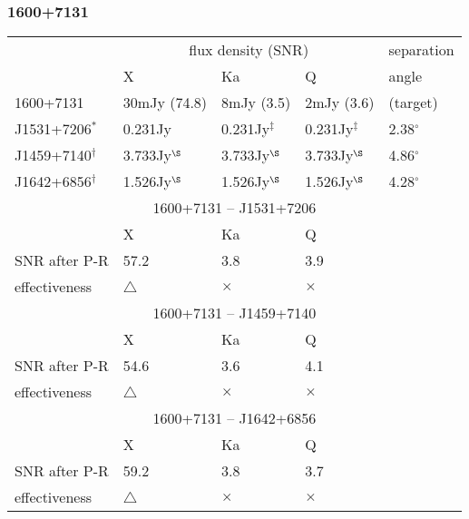 \subsubsection{
  1600+7131
}
\begin{tabular}{p{30mm}|p{30mm}|p{30mm}|p{30mm}|p{20mm}}
\hline
                 & \multicolumn{3}{c|}{flux density (SNR)}
                 & separation \\
\cline{2-4}
                 & X
                 & Ka
                 & Q
                 & angle \\
\hline
1600+7131        &  30mJy (74.8)
                 &   8mJy (3.5)
                 &   2mJy (3.6)
                 & (target)   \\
\hline
J1531+7206$^*$   & 0.231Jy
                 & 0.231Jy$^\ddag$
                 & 0.231Jy$^\ddag$
                 & 2.38$^\circ$ \\
\hline
J1459+7140$^\dag$& 3.733Jy$^\S$
                 & 3.733Jy$^\S$
                 & 3.733Jy$^\S$
                 & 4.86$^\circ$ \\
\hline
J1642+6856$^\dag$& 1.526Jy$^\S$
                 & 1.526Jy$^\S$
                 & 1.526Jy$^\S$
                 & 4.28$^\circ$ \\
\hline
\hline
\multicolumn{5}{c}{1600+7131 -- J1531+7206}         \\
\hline
              &  X          & Ka         & \multicolumn{2}{l}{Q}       \\
\hline
SNR after P-R & 57.2        &  3.8       & \multicolumn{2}{l}{3.9}     \\
\hline
effectiveness & $\triangle$ & $\times$   & \multicolumn{2}{l}{$\times$}\\
\hline
\hline
\multicolumn{5}{c}{1600+7131 -- J1459+7140}         \\
\hline
              &  X          & Ka         & \multicolumn{2}{l}{Q}       \\
\hline
SNR after P-R & 54.6        & 3.6        & \multicolumn{2}{l}{4.1}     \\
\hline
effectiveness & $\triangle$ & $\times$   & \multicolumn{2}{l}{$\times$}\\
\hline
\hline
\multicolumn{5}{c}{1600+7131 -- J1642+6856}         \\
\hline
              &  X          & Ka         & \multicolumn{2}{l}{Q}       \\
\hline
SNR after P-R & 59.2        & 3.8        & \multicolumn{2}{l}{3.7}     \\
\hline
effectiveness & $\triangle$ & $\times$   & \multicolumn{2}{l}{$\times$}\\
\hline
\end{tabular}

